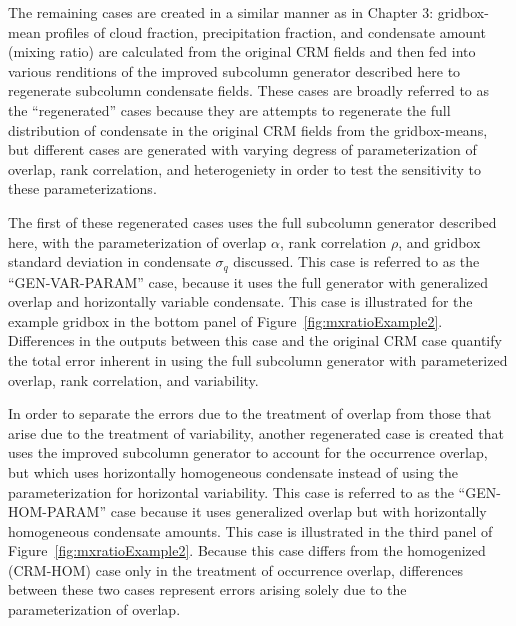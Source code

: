 The remaining cases are created in a similar manner as in Chapter 3:
gridbox-mean profiles of cloud fraction, precipitation fraction, and
condensate amount (mixing ratio) are calculated from the original CRM
fields and then fed into various renditions of the improved subcolumn
generator described here to regenerate subcolumn condensate fields.
These cases are broadly referred to as the ``regenerated'' cases because
they are attempts to regenerate the full distribution of condensate in
the original CRM fields from the gridbox-means, but different cases are
generated with varying degress of parameterization of overlap, rank
correlation, and heterogeniety in order to test the sensitivity to these
parameterizations.

The first of these regenerated cases uses the full subcolumn generator
described here, with the parameterization of overlap \(\alpha\), rank
correlation \(\rho\), and gridbox standard deviation in condensate
\(\sigma_q\) discussed. This case is referred to as the
``GEN-VAR-PARAM'' case, because it uses the full generator with
generalized overlap and horizontally variable condensate. This case is
illustrated for the example gridbox in the bottom panel of
Figure~\ref{fig:mxratioExample2}. Differences in the outputs between
this case and the original CRM case quantify the total error inherent in
using the full subcolumn generator with parameterized overlap, rank
correlation, and variability.

In order to separate the errors due to the treatment of overlap from
those that arise due to the treatment of variability, another
regenerated case is created that uses the improved subcolumn generator
to account for the occurrence overlap, but which uses horizontally
homogeneous condensate instead of using the parameterization for
horizontal variability. This case is referred to as the
``GEN-HOM-PARAM'' case because it uses generalized overlap but with
horizontally homogeneous condensate amounts. This case is illustrated in
the third panel of Figure~\ref{fig:mxratioExample2}. Because this case
differs from the homogenized (CRM-HOM) case only in the treatment of
occurrence overlap, differences between these two cases represent errors
arising solely due to the parameterization of overlap.

